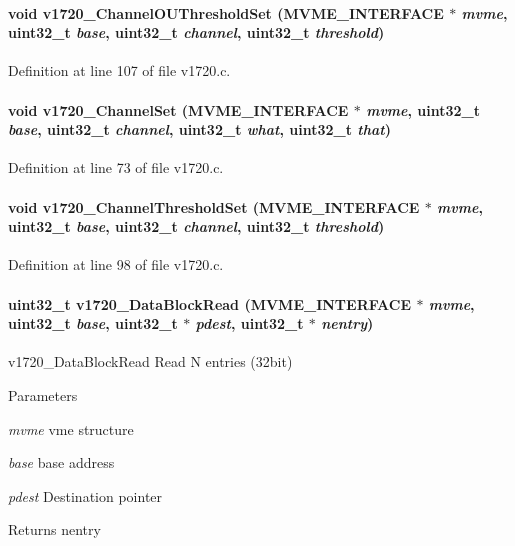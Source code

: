 \paragraph[{v1720\_\-ChannelOUThresholdSet}]{\setlength{\rightskip}{0pt plus 5cm}void v1720\_\-ChannelOUThresholdSet ({\bf MVME\_\-INTERFACE} $\ast$ {\em mvme}, \/  uint32\_\-t {\em base}, \/  uint32\_\-t {\em channel}, \/  uint32\_\-t {\em threshold})}\hfill\label{v1720drv_8h_ad23d27240d4832dda63108a2642c8ac9}


Definition at line 107 of file v1720.c.
\paragraph[{v1720\_\-ChannelSet}]{\setlength{\rightskip}{0pt plus 5cm}void v1720\_\-ChannelSet ({\bf MVME\_\-INTERFACE} $\ast$ {\em mvme}, \/  uint32\_\-t {\em base}, \/  uint32\_\-t {\em channel}, \/  uint32\_\-t {\em what}, \/  uint32\_\-t {\em that})}\hfill\label{v1720drv_8h_aaa370ced27664e48c762a4cb15ebd4bc}


Definition at line 73 of file v1720.c.
\paragraph[{v1720\_\-ChannelThresholdSet}]{\setlength{\rightskip}{0pt plus 5cm}void v1720\_\-ChannelThresholdSet ({\bf MVME\_\-INTERFACE} $\ast$ {\em mvme}, \/  uint32\_\-t {\em base}, \/  uint32\_\-t {\em channel}, \/  uint32\_\-t {\em threshold})}\hfill\label{v1720drv_8h_a381761572642d5968887fc4a4af210b1}


Definition at line 98 of file v1720.c.
\paragraph[{v1720\_\-DataBlockRead}]{\setlength{\rightskip}{0pt plus 5cm}uint32\_\-t v1720\_\-DataBlockRead ({\bf MVME\_\-INTERFACE} $\ast$ {\em mvme}, \/  uint32\_\-t {\em base}, \/  uint32\_\-t $\ast$ {\em pdest}, \/  uint32\_\-t $\ast$ {\em nentry})}\hfill\label{v1720drv_8h_ad72f8cd0b6dc80af08ee5e9a7fe03f4c}
v1720\_\-DataBlockRead Read N entries (32bit) 
\begin{DoxyParams}{Parameters}
\item[{\em mvme}]vme structure \item[{\em base}]base address \item[{\em pdest}]Destination pointer \end{DoxyParams}
\begin{DoxyReturn}{Returns}
nentry 
\end{DoxyReturn}


